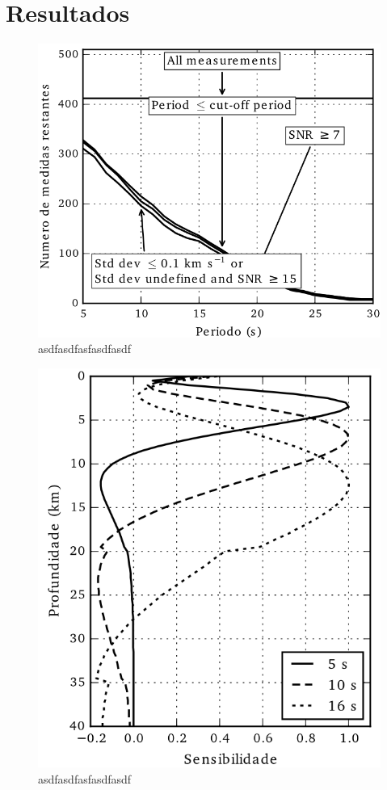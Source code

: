 \section{Resultados}



\begin{figure}[!ht]
\centering
\includegraphics[scale=1]{Figs/corr_selecao.png}
\caption{asdfasdfasfasdfasdf}
\label{corr_selecao}
\end{figure}

\begin{figure}[!ht]
\centering
\includegraphics[scale=1]{Figs/sensibilidade.png}
\caption{asdfasdfasfasdfasdf}
\label{sensibilidade}
\end{figure}

